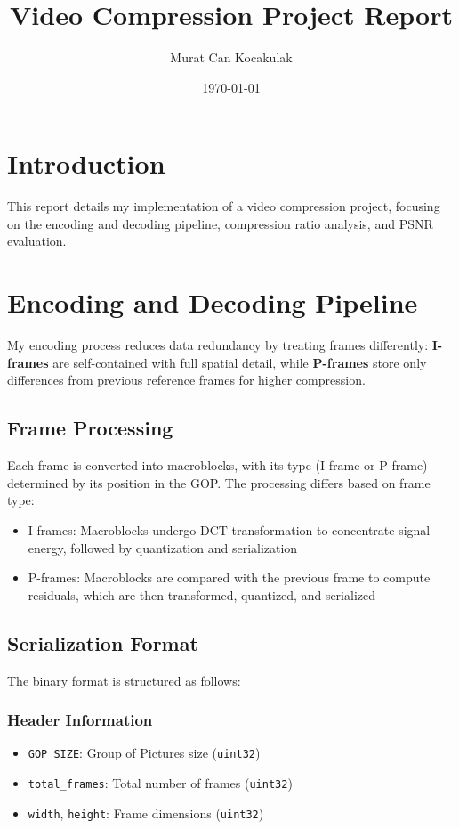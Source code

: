 \documentclass{article}
\title{Video Compression Project Report}
\author{Murat Can Kocakulak}
\date{\today}
\begin{document}
\maketitle

\section{Introduction}
This report details my implementation of a video compression project, focusing on the encoding and decoding pipeline, compression ratio analysis, and PSNR evaluation.

\section{Encoding and Decoding Pipeline}
My encoding process reduces data redundancy by treating frames differently: \textbf{I-frames} are self-contained with full spatial detail, while \textbf{P-frames} store only differences from previous reference frames for higher compression.

\subsection{Frame Processing}
Each frame is converted into macroblocks, with its type (I-frame or P-frame) determined by its position in the GOP. The processing differs based on frame type:
\begin{itemize}
    \item I-frames: Macroblocks undergo DCT transformation to concentrate signal energy, followed by quantization and serialization
    \item P-frames: Macroblocks are compared with the previous frame to compute residuals, which are then transformed, quantized, and serialized
\end{itemize}

\subsection{Serialization Format}
The binary format is structured as follows:

\subsubsection{Header Information}
\begin{itemize}
    \item \texttt{GOP\_SIZE}: Group of Pictures size (\texttt{uint32})
    \item \texttt{total\_frames}: Total number of frames (\texttt{uint32})
    \item \texttt{width}, \texttt{height}: Frame dimensions (\texttt{uint32})
\end{itemize}
\end{document}

